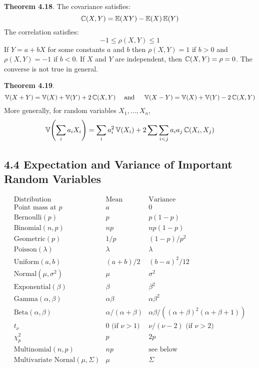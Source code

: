 \textbf{Theorem 4.18}. The covariance satisfies:
\[
\operatorname{\mathbb{C}}(X, Y) = \operatorname{\mathbb{E}}(XY) - \operatorname{\mathbb{E}}(X) \operatorname{\mathbb{E}}(Y)
\]
The correlation satisfies:
\[
-1 \leq \rho(X, Y) \leq 1
\]
If \(Y = a + bX\) for some constants \(a\) and \(b\) then
\(\rho(X, Y) = 1\) if \(b > 0\) and \(\rho(X, Y) = -1\) if \(b < 0\). If
\(X\) and \(Y\) are independent, then \(\operatorname{\mathbb{C}}(X, Y) = \rho = 0\).
The converse is not true in general.

\textbf{Theorem 4.19}.
\[
\operatorname{\mathbb{V}}(X + Y) = \operatorname{\mathbb{V}}(X) + \operatorname{\mathbb{V}}(Y) + 2 \operatorname{\mathbb{C}}(X, Y)
\quad \text{ and } \quad
\operatorname{\mathbb{V}}(X - Y) = \operatorname{\mathbb{V}}(X) + \operatorname{\mathbb{V}}(Y) - 2 \operatorname{\mathbb{C}}(X, Y)
\]
More generally, for random variables \(X_{1}, \dots, X_{n}\),
\[
\VAR\left( \sum_{i} a_{i} X_{i} \right) = \sum_{i} a_{i}^{2} \VAR(X_{i}) + 2 \sum \sum_{i < j} a_{i} a_{j} \COV(X_{i}, X_{j})
\]

\subsection*{4.4 Expectation and Variance of Important Random
Variables}\label{expectation-and-variance-of-important-random-variables}
\[
\begin{array}{lll}
\text{Distribution} & \text{Mean} & \text{Variance}\\
\hline
\text{Point mass at } p      & a             & 0                \\
\text{Bernoulli}(p)          & p             & p(1-p)           \\
\text{Binomial}(n, p)        & np            & np(1-p)          \\
\text{Geometric}(p)          & 1/p           & (1 - p)/p^{2}    \\
\text{Poisson}(\lambda)      & \lambda       & \lambda          \\
\text{Uniform}(a, b)         & (a + b) / 2   & (b - a)^{2} / 12 \\
\text{Normal}(\mu, \sigma^{2}) & \mu           & \sigma^{2}     \\
\text{Exponential}(\beta)    & \beta         & \beta^{2}        \\
\text{Gamma}(\alpha, \beta)  & \alpha \beta  & \alpha \beta^{2} \\
\text{Beta}(\alpha, \beta)   & \alpha / (\alpha + \beta) & \alpha \beta / ((\alpha + \beta)^{2} (\alpha + \beta + 1)) \\
t_\nu                        & 0 \text{ (if } \nu > 1 \text{)} & \nu / (\nu - 2) \text{ (if } \nu > 2 \text{)} \\
\chi^{2}_{p}                     & p             & 2p           \\
\text{Multinomial}(n, p)     & np            & \text{see below} \\
\text{Multivariate Nornal}(\mu, \Sigma) & \mu & \Sigma \\
\end{array}
\]
